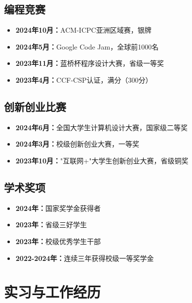 \documentclass[a4paper,12pt]{article}
\begin{document}
\subsection{编程竞赛}
\begin{itemize}
    \item \textbf{2024年10月：}ACM-ICPC亚洲区域赛，银牌
    \item \textbf{2024年5月：}Google Code Jam，全球前1000名
    \item \textbf{2023年11月：}蓝桥杯程序设计大赛，省级一等奖
    \item \textbf{2023年4月：}CCF-CSP认证，满分（300分）
\end{itemize}

\subsection{创新创业比赛}
\begin{itemize}
    \item \textbf{2024年6月：}全国大学生计算机设计大赛，国家级二等奖
    \item \textbf{2024年3月：}校级创新创业大赛，一等奖
    \item \textbf{2023年10月：}"互联网+"大学生创新创业大赛，省级铜奖
\end{itemize}

\subsection{学术奖项}
\begin{itemize}
    \item \textbf{2024年：}国家奖学金获得者
    \item \textbf{2023年：}省级三好学生
    \item \textbf{2023年：}校级优秀学生干部
    \item \textbf{2022-2024年：}连续三年获得校级一等奖学金
\end{itemize}

\section{实习与工作经历}
\end{document}

